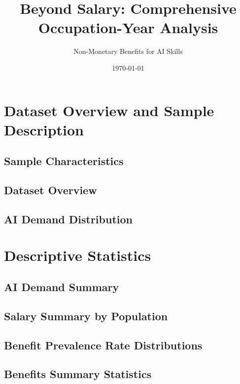 \documentclass{article}
\title{Beyond Salary: Comprehensive Occupation-Year Analysis}
\author{Non-Monetary Benefits for AI Skills}
\date{\today}
\begin{document}
\maketitle

\tableofcontents
\newpage

\section{Dataset Overview and Sample Description}
\subsection{Sample Characteristics}


\subsection{Dataset Overview}


\subsection{AI Demand Distribution}


\section{Descriptive Statistics}
\subsection{AI Demand Summary}


\subsection{Salary Summary by Population}


\subsection{Benefit Prevalence Rate Distributions}


\subsection{Benefits Summary Statistics}

\end{document}
